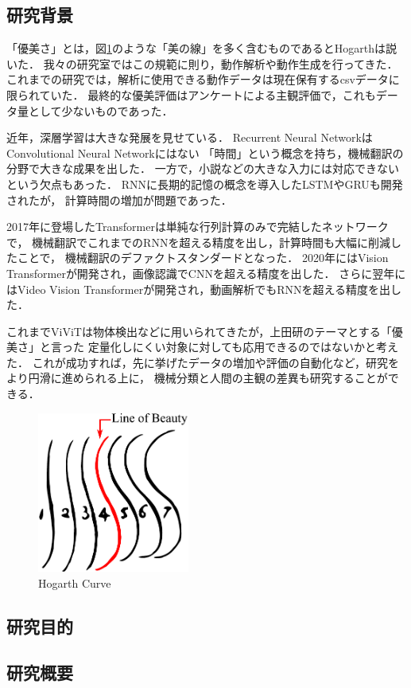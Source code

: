 \subsection{研究背景}
「優美さ」とは，図\ref{hogarth_curve}のような「美の線」を多く含むものであるとHogarthは説いた．
我々の研究室ではこの規範に則り，動作解析や動作生成を行ってきた．
これまでの研究では，解析に使用できる動作データは現在保有するcsvデータに限られていた．
最終的な優美評価はアンケートによる主観評価で，これもデータ量として少ないものであった．

近年，深層学習は大きな発展を見せている．
Recurrent Neural Network\cite{rnn}はConvolutional Neural Network\cite{cnn}にはない
「時間」という概念を持ち，機械翻訳の分野で大きな成果を出した．
一方で，小説などの大きな入力には対応できないという欠点もあった．
RNNに長期的記憶の概念を導入したLSTM\cite{lstm}やGRU\cite{gru}も開発されたが，
計算時間の増加が問題であった．

2017年に登場したTransformer\cite{transformer}は単純な行列計算のみで完結したネットワークで，
機械翻訳でこれまでのRNNを超える精度を出し，計算時間も大幅に削減したことで，
機械翻訳のデファクトスタンダードとなった．
2020年にはVision Transformer\cite{vit}が開発され，画像認識でCNNを超える精度を出した．
さらに翌年にはVideo Vision Transformer\cite{vivit}が開発され，動画解析でもRNNを超える精度を出した．

これまでViViTは物体検出などに用いられてきたが，上田研のテーマとする「優美さ」と言った
定量化しにくい対象に対しても応用できるのではないかと考えた．
これが成功すれば，先に挙げたデータの増加や評価の自動化など，研究をより円滑に進められる上に，
機械分類と人間の主観の差異も研究することができる．

\begin{figure}[b]
  \begin{center}
   \includegraphics[width=50mm]{images/hogarth_curve.pdf}
  \end{center}
  \caption{Hogarth Curve}
  \label{hogarth_curve}
\end{figure}

\clearpage

\subsection{研究目的}

\subsection{研究概要}